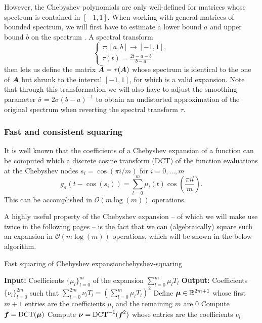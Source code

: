\documentclass[12pt]{article}
\begin{document}
However, the Chebyshev polynomials are only well-defined for matrices whose spectrum is contained in $[-1, 1]$. When working with general matrices of bounded spectrum, we will first have to estimate a lower bound $a$ and upper bound $b$ on the spectrum \cite{zhou-2011-bounding-spectrum}. A spectral transform
\begin{equation}
    \begin{cases}
        \tau : [a, b] \to [-1, 1],\\
        \tau(t) = \frac{2t - a - b}{b - a}.
    \end{cases}
\end{equation}
then lets us define the matrix $\bar{\boldsymbol{A}} = \tau(\boldsymbol{A})$ whose spectrum is identical to the one of $\boldsymbol{A}$ but shrunk to the interval $[-1, 1]$, for which  is a valid expansion. Note that through this transformation we will also have to adjust the smoothing parameter $\bar{\sigma} = 2 \sigma (b - a)^{-1}$ to obtain an undistorted approximation of the original spectrum when reverting the spectral transform $\tau$.

\subsubsection{Fast and consistent squaring}
\label{subsubsec:dct}

It is well known that the coefficients of a Chebyshev expansion of a function can be computed which a discrete cosine transform (DCT) of the function evaluations at the Chebyshev nodes $s_i = \cos(\pi i / m)$ for $i=0,\dots,m$
\begin{equation}
    g_{\sigma}(t - \cos(s_i)) = \sum_{l=0}^{m} \mu_l(t) \cos\left(\frac{\pi i l}{m} \right).
    \label{equ:discrete-cosine-transform}
\end{equation}
This can be accomplished in $\mathcal{O}(m \log(m))$ operations.

A highly useful property of the Chebyshev expansion -- of which we will make use twice in the following pages -- is the fact that we can (algebraically) square such an expansion in $\mathcal{O}(m \log(m))$ operations, which will be shown in the below algorithm.

\begin{algo}{Fast squaring of Chebyshev expansion}{chebyshev-squaring}
    \begin{algorithmic}[1]
        \Statex \textbf{Input:} Coefficients $\{ \mu_l \}_{l=0}^{m}$ of the expansion $\sum_{l=0}^{m} \mu_l T_l$
        \Statex \textbf{Output:} Coefficients $\{ \nu_l \}_{l=0}^{2m}$ such that $\sum_{l=0}^{2m} \nu_l T_l = (\sum_{l=0}^{m} \mu_l T_l)^2$
        \State Define $\boldsymbol{\mu} \in \mathbb{R}^{2m + 1}$ whose first $m + 1$ entries are the coefficients $\mu_l$ and the remaining $m$ are $0$
    \State Compute $\boldsymbol{f} = \operatorname{DCT}(\boldsymbol{\mu})$
    \State Compute $\boldsymbol{\nu} = \operatorname{DCT}^{-1}(\boldsymbol{f}^{2})$ whose entries are the coefficients $\nu_l$
    \end{algorithmic}
    \end{algo}
\end{document}
